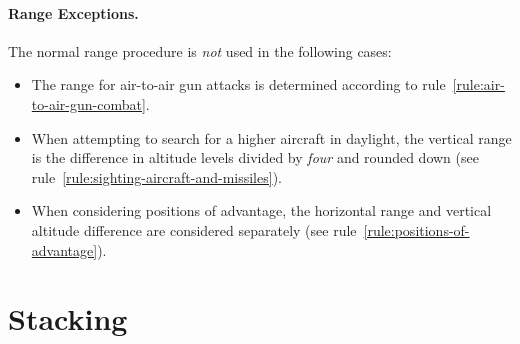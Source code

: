 {


\paragraph{Range Exceptions.}
The normal range procedure is \emph{not} used in the following cases:
\begin{itemize}

\item
The range for air-to-air gun attacks is determined according to rule~\ref{rule:air-to-air-gun-combat}.

\item
When attempting to search for a higher aircraft in daylight, the vertical range is the difference in altitude levels divided by \emph{four} and rounded down (see rule~\ref{rule:sighting-aircraft-and-missiles}).

\item
When considering positions of advantage, the horizontal range and vertical altitude difference are considered separately (see rule~\ref{rule:positions-of-advantage}).

\end{itemize}

}

\section{Stacking}


